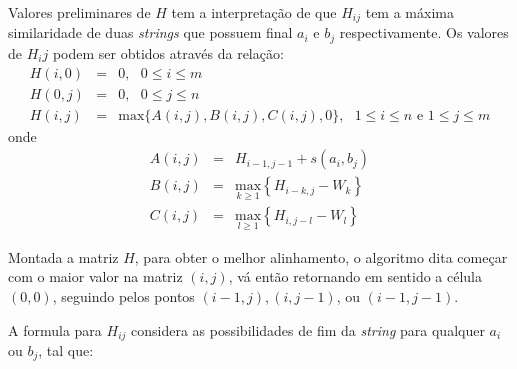 Valores preliminares de $H$ tem a interpretação de que $H_{ij}$ tem a máxima similaridade de duas \textit{strings} que possuem final $a_i$ e $b_j$ respectivamente. Os valores de $H_ij$ podem ser obtidos através da relação:
\begin{eqnarray*}
	H(i,0) &=& 0, \, \, \, \, 0 \leq i \leq m \\
	H(0,j) &=& 0, \, \, \, \, 0 \leq j \leq n \\
	H(i,j) &=& \text{max}\lbrace A(i,j), B(i,j), C(i,j), 0\rbrace, \, \, \, \, 1 \leq i \leq n \text{ e } 1 \leq j \leq m
\end{eqnarray*}
onde
\begin{eqnarray*}
		A(i, j) &=& H_{i-1,j-1} + s(a_i,b_j) \\
		B(i, j) &=& \underset{k\geq1}{\text{max}} \left\{H_{i-k,j} - W_k\right\}\\ 
		C(i, j) &=& \underset{l\geq1}{\text{max}} \left\{H_{i,j-l} - W_l\right\}
\end{eqnarray*}

Montada a matriz $H$, para obter o melhor alinhamento, o algoritmo dita começar com o maior valor na matriz $(i,j)$, vá então retornando em sentido a célula $(0,0)$, seguindo pelos pontos $(i - 1,j), (i, j - 1)$, ou $(i - 1, j - 1)$.

A formula para $H_{ij}$ considera as possibilidades de fim da \textit{string} para qualquer $a_i$ ou $b_j$, tal que:

